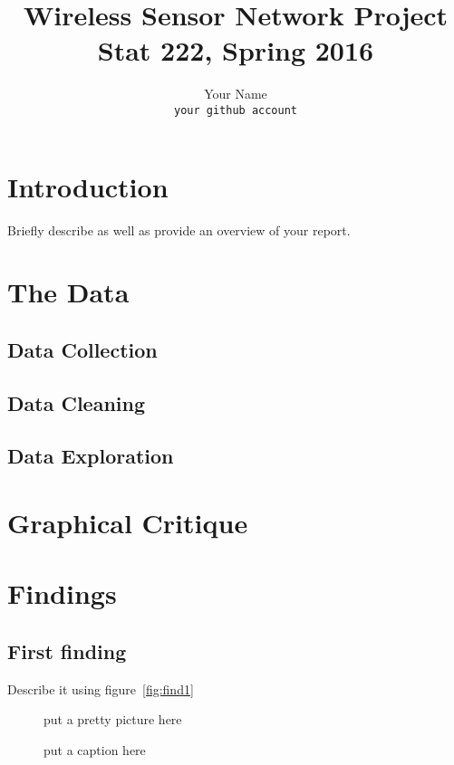 \documentclass[11pt]{article}
\title{Wireless Sensor Network Project\\
  Stat 222, Spring 2016}
\author{
  Your Name\\
  \texttt{your github account}
}
\begin{document}
\maketitle



\section{Introduction}

Briefly describe \cite{tolle2005macroscope, yang2003redwoods} as well as
provide an overview of your report.

\section{The Data}


\subsection{Data Collection}


\subsection{Data Cleaning}


\subsection{Data Exploration}


\section{Graphical Critique}


\section{Findings}


\subsection{First finding}

Describe it using figure~\ref{fig:find1}

\begin{figure}
  \centering
    put a pretty picture here
  \caption{put a caption here}
  \label{fig:find3}
\end{figure}
\end{document}
